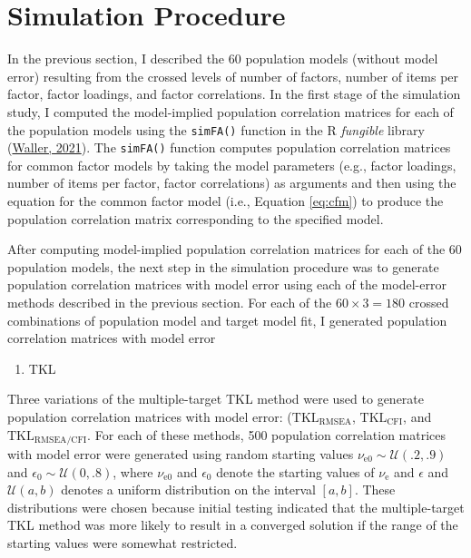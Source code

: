 \documentclass[11pt]{umnthesis}
\begin{document}
\hypertarget{simulation-procedure}{%
\section{Simulation Procedure}\label{simulation-procedure}}

In the previous section, I described the 60 population models (without model error) resulting from the crossed levels of number of factors, number of items per factor, factor loadings, and factor correlations. In the first stage of the simulation study, I computed the model-implied population correlation matrices for each of the population models using the \texttt{simFA()} function in the R \emph{fungible} library (\protect\hyperlink{ref-waller2021}{Waller, 2021}). The \texttt{simFA()} function computes population correlation matrices for common factor models by taking the model parameters (e.g., factor loadings, number of items per factor, factor correlations) as arguments and then using the equation for the common factor model (i.e., Equation \eqref{eq:cfm}) to produce the population correlation matrix corresponding to the specified model.

After computing model-implied population correlation matrices for each of the 60 population models, the next step in the simulation procedure was to generate population correlation matrices with model error using each of the model-error methods described in the previous section. For each of the \(60 \times 3 = 180\) crossed combinations of population model and target model fit, I generated population correlation matrices with model error

\begin{enumerate}
\def\labelenumi{\arabic{enumi}.}
\tightlist
\item
  TKL
\end{enumerate}

Three variations of the multiple-target TKL method were used to generate population correlation matrices with model error: (\(\textrm{TKL}_\textrm{RMSEA}\), \(\textrm{TKL}_\textrm{CFI}\), and \(\textrm{TKL}_\textrm{RMSEA/CFI}\). For each of these methods, 500 population correlation matrices with model error were generated using random starting values \(\nu_{\textrm{e}0} \sim \mathcal{U}(.2, .9)\) and \(\epsilon_0 \sim \mathcal{U}(0, .8)\), where \(\nu_{\textrm{e}0}\) and \(\epsilon_0\) denote the starting values of \(\nu_{\textrm{e}}\) and \(\epsilon\) and \(\mathcal{U}(a, b)\) denotes a uniform distribution on the interval \([a, b]\). These distributions were chosen because initial testing indicated that the multiple-target TKL method was more likely to result in a converged solution if the range of the starting values were somewhat restricted.
\end{document}
